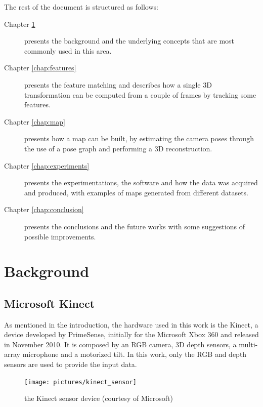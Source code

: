 The rest of the document is structured as follows:
\begin{description}
\item[Chapter \ref{chap:background}] presents the background and the underlying concepts that are most commonly used in this area.
\item[Chapter \ref{chap:features}] presents the feature matching and describes how a single 3D transformation can be computed  from a couple of frames by tracking some features.
\item[Chapter \ref{chap:map}] presents how a map can be built, by estimating the camera poses through the use of a pose graph and performing a 3D reconstruction.
\item[Chapter \ref{chap:experiments}] presents the experimentations, the software and how the data was acquired and produced, with examples of maps generated from different datasets.
\item[Chapter \ref{chap:conclusion}] presents the conclusions and the future works with some suggestions of possible improvements.
\end{description}

\chapter{Background}
\label{chap:background}

\section{Microsoft Kinect}

As mentioned in the introduction, the hardware used in this work is the Kinect, a device developed by PrimeSense, initially for the Microsoft Xbox 360 and released in November 2010. It is composed by an RGB camera, 3D depth sensors, a multi-array microphone and a motorized tilt. In this work, only the RGB and depth sensors are used to provide the input data.

\begin{figure}[H]
\centering
\texttt{[image: pictures/kinect\_sensor]}
\caption{the Kinect sensor device (courtesy of Microsoft)}
\end{figure}

